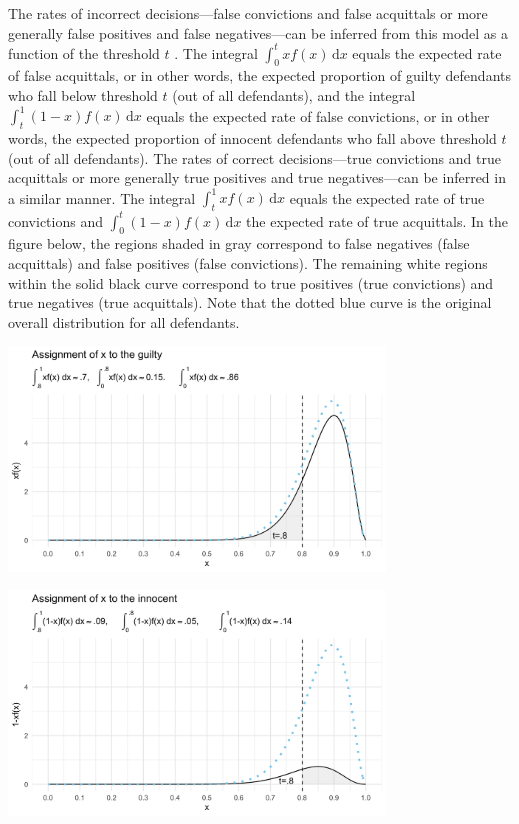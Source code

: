 \documentclass[10pt,dvipsnames,enabledeprecatedfontcommands]{scrartcl}
\begin{document}
The rates of incorrect decisions---false convictions and false
acquittals or more generally false positives and false negatives---can
be inferred from this model as a function of the threshold \(t\)
\citep{hamer2004, hamer2014}. The integral
\(\int_0^t \! xf(x) \, \mathrm{d}x\) equals the expected rate of false
acquittals, or in other words, the expected proportion of guilty
defendants who fall below threshold \(t\) (out of all defendants), and
the integral \(\int_t^1 \! (1-x)f(x) \, \mathrm{d}x\) equals the
expected rate of false convictions, or in other words, the expected
proportion of innocent defendants who fall above threshold \(t\) (out of
all defendants). The rates of correct decisions---true convictions and
true acquittals or more generally true positives and true
negatives---can be inferred in a similar manner. The integral
\(\int_t^1 \! xf(x) \, \mathrm{d}x\) equals the expected rate of true
convictions and \(\int_0^t \! (1-x)f(x) \, \mathrm{d}x\) the expected
rate of true acquittals. In the figure below, the regions shaded in gray
correspond to false negatives (false acquittals) and false positives
(false convictions). The remaining white regions within the solid black
curve correspond to true positives (true convictions) and true negatives
(true acquittals). Note that the dotted blue curve is the original
overall distribution for all defendants.

\begin{center}
    \includegraphics[width=10cm]{xfx3.png}
\end{center}

\begin{center}
    \includegraphics[width=10cm]{nxfx3.png}
\end{center}
\end{document}

